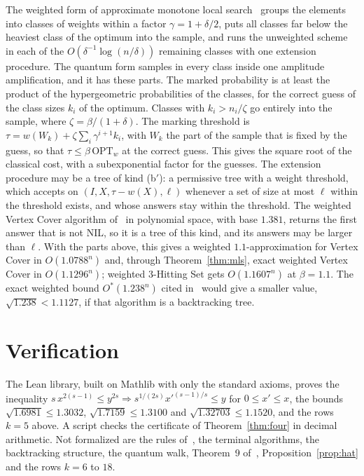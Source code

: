 \documentclass[11pt]{article}
\theoremstyle{remark}
\begin{document}
The weighted form of approximate monotone local search~\cite{EKMNS23} groups the elements into classes of weights within a factor $\gamma = 1 + \delta/2$, puts all classes far below the heaviest class of the optimum into the sample, and runs the unweighted scheme in each of the $O(\delta^{-1}\log(n/\delta))$ remaining classes with one extension procedure. The quantum form samples in every class inside one amplitude amplification, and it has these parts. The marked probability is at least the product of the hypergeometric probabilities of the classes, for the correct guess of the class sizes $k_i$ of the optimum. Classes with $k_i > n_i/\zeta$ go entirely into the sample, where $\zeta = \beta/(1+\delta)$. The marking threshold is $\tau = w(W_k) + \zeta \sum_i \gamma^{i+1} k_i$, with $W_k$ the part of the sample that is fixed by the guess, so that $\tau \le \beta\,\mathrm{OPT}_w$ at the correct guess. This gives the square root of the classical cost, with a subexponential factor for the guesses. The extension procedure may be a tree of kind (b$'$): a permissive tree with a weight threshold, which accepts on $(I, X, \tau - w(X), \ell)$ whenever a set of size at most $\ell$ within the threshold exists, and whose answers stay within the threshold. The weighted Vertex Cover algorithm of~\cite{SZ15} in polynomial space, with base $1.381$, returns the first answer that is not NIL, so it is a tree of this kind, and its answers may be larger than $\ell$. With the parts above, this gives a weighted $1.1$-approximation for Vertex Cover in $O(1.0788^n)$ and, through Theorem~\ref{thm:mls}, exact weighted Vertex Cover in $O(1.1296^n)$; weighted 3-Hitting Set gets $O(1.1607^n)$ at $\beta = 1.1$. The exact weighted bound $O^*(1.238^n)$ cited in~\cite{EKMNS23} would give a smaller value, $\sqrt{1.238} < 1.1127$, if that algorithm is a backtracking tree.

\section{Verification}\label{sec:lean}

The Lean library, built on Mathlib with only the standard axioms, proves the inequality $s\, x^{2(s-1)} \le y^{2s} \Rightarrow s^{1/(2s)} x'^{(s-1)/s} \le y$ for $0 \le x' \le x$, the bounds $\sqrt{1.6981} \le 1.3032$, $\sqrt{1.7159} \le 1.3100$ and $\sqrt{1.32703} \le 1.1520$, and the rows $k = 5$ above. A script checks the certificate of Theorem~\ref{thm:four} in decimal arithmetic. Not formalized are the rules of~\cite{WGJ24}, the terminal algorithms, the backtracking structure, the quantum walk, Theorem~9 of~\cite{SM22}, Proposition~\ref{prop:hat} and the rows $k = 6$ to $18$.
\end{document}
